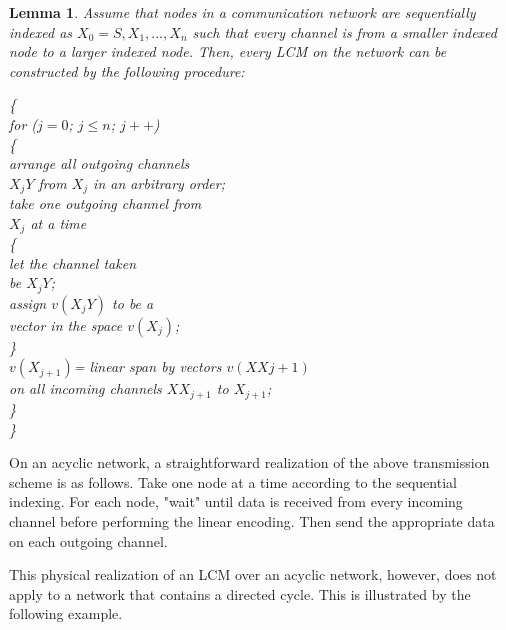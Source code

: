 \documentclass[journal]{IEEEtran}
\newtheorem{lemm}[prop]{Lemma}
\begin{document}
\begin{lemm}
	Assume that nodes in a communication network are sequentially indexed as $X_0=S,X_1, \dots, X_n$ such that every channel is from a smaller indexed node to a larger indexed node. Then, every LCM on the network can be constructed by the following procedure:

	\begin{tabbing}
   \{  \\
	   \qquad for ($j=0$; $j\leq n$; $j++$)\\
	   \qquad \qquad \{ \\
	   \qquad  \qquad arrange all outgoing channels\\ \qquad  \qquad$X_jY$ from $X_j$ in an arbitrary order;\\
	   \qquad \qquad take one outgoing channel from\\ \qquad  \qquad$X_j$ at a time\\
	    \qquad \qquad \qquad \{ \\
	    \qquad \qquad \qquad \qquad let the channel taken\\ 
	    \qquad \qquad \qquad \qquad be $X_jY$;\\
 	    \qquad \qquad \qquad \qquad assign $v(X_jY)$ to be a \\ 
 	    \qquad \qquad \qquad \qquad vector in the space $v(X_j)$;\\
	   \qquad \qquad \qquad  \}\\
	    \qquad \qquad  $v(X_{j+1})$= linear span by vectors $v(XX{j+1})$ \\
	    \qquad \qquad on all incoming channels $XX_{j+1}$ to $X_{j+1}$;\\
	    \qquad \qquad \}\\
   \} 
   \end{tabbing}
\end{lemm}


\par
On an acyclic network, a straightforward realization of the above transmission scheme is as follows. Take one node at a time according to the sequential indexing. For each node, "wait" until data is received from every incoming channel before performing the linear encoding. Then send the appropriate data on each outgoing channel.
\par
This physical realization of an LCM over an acyclic network, however, does not apply to a network that contains a directed cycle. This is illustrated by the following example.
\end{document}
